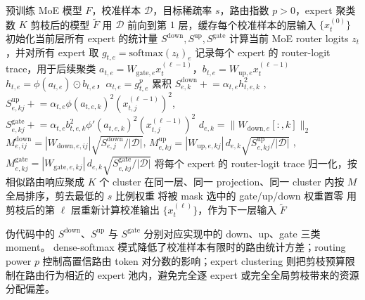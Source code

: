 \documentclass[letterpaper]{article}
\begin{document}
\begin{algorithm*}[t]
\small
\caption{MoE-Wanda：路由感知的 MoE-SwiGLU 剪枝}
\label{alg:moe_wanda}
\begin{algorithmic}[1]
\Require 预训练 MoE 模型 $F$，校准样本 $\mathcal{D}$，目标稀疏率 $s$，路由指数 $p>0$，expert 聚类数 $K$
\Ensure 剪枝后的模型 $\widetilde{F}$
\State 用 $\mathcal{D}$ 前向到第 $1$ 层，缓存每个校准样本的层输入 $\{x^{(0)}_t\}$
    \State 初始化当前层所有 expert 的统计量 $S^{\mathrm{down}},S^{\mathrm{up}},S^{\mathrm{gate}}$
        \State 计算当前 MoE router logits $z_t$，并对所有 expert 取 $g_{t,e}=\mathrm{softmax}(z_t)_e$
        \State 记录每个 expert 的 router-logit trace，用于后续聚类
            \State $a_{t,e}=W_{\mathrm{gate},e}x_t^{(\ell-1)}$，$b_{t,e}=W_{\mathrm{up},e}x_t^{(\ell-1)}$
            \State $h_{t,e}=\phi(a_{t,e})\odot b_{t,e}$，$\alpha_{t,e}=g_{t,e}^{p}$
            \State 累积 $S^{\mathrm{down}}_{e,k}\mathrel{+}= \alpha_{t,e} h_{t,e,k}^{2}$ ,$S^{\mathrm{up}}_{e,kj}\mathrel{+}= \alpha_{t,e}\phi(a_{t,e,k})^{2}(x_{t,j}^{(\ell-1)})^{2}$, $S^{\mathrm{gate}}_{e,kj}\mathrel{+}= \alpha_{t,e}b_{t,e,k}^{2}\phi'(a_{t,e,k})^{2}(x_{t,j}^{(\ell-1)})^{2}$
        \EndFor
    \EndFor
        \State $d_{e,k}=\|W_{\mathrm{down},e}[:,k]\|_2$
        \State $M^{\mathrm{down}}_{e,ij}=|W_{\mathrm{down},e,ij}|\sqrt{S^{\mathrm{down}}_{e,j}/|\mathcal{D}|}$, $M^{\mathrm{up}}_{e,kj}=|W_{\mathrm{up},e,kj}|\,d_{e,k}\sqrt{S^{\mathrm{up}}_{e,kj}/|\mathcal{D}|}$ ,$M^{\mathrm{gate}}_{e,kj}=|W_{\mathrm{gate},e,kj}|\,d_{e,k}\sqrt{S^{\mathrm{gate}}_{e,kj}/|\mathcal{D}|}$
    \EndFor
    \State 将每个 expert 的 router-logit trace 归一化，按相似路由响应聚成 $K$ 个 cluster
    \State 在同一层、同一 projection、同一 cluster 内按 $M$ 全局排序，剪去最低的 $s$ 比例权重
    \State 将被 mask 选中的 gate/up/down 权重置零
    \State 用剪枝后的第 $\ell$ 层重新计算校准输出 $\{x_t^{(\ell)}\}$，作为下一层输入
\EndFor
\State \Return $\widetilde{F}$
\end{algorithmic}
\end{algorithm*}

伪代码中的 $S^{\mathrm{down}}$、$S^{\mathrm{up}}$ 与 $S^{\mathrm{gate}}$ 分别对应实现中的 down、up、gate 三类 moment。
dense-softmax 模式降低了校准样本有限时的路由统计方差；routing power $p$ 控制高置信路由 token 对分数的影响；expert clustering 则把剪枝预算限制在路由行为相近的 expert 池内，避免完全逐 expert 或完全全局剪枝带来的资源分配偏差。
\end{document}
